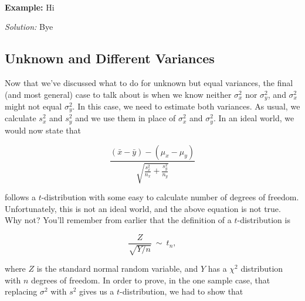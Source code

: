 ~



\textbf{Example:}  Hi \ex



\emph{Solution:} Bye









\subsection{Unknown and Different Variances}



Now that we've discussed what to do for unknown but equal variances, the final (and most general) case to talk about is when we know neither $\sigma^2_x$ nor $\sigma^2_y$, and $\sigma^2_x$ might not equal $\sigma^2_y$.  In this case, we need to estimate both variances.  As usual, we calculate $s^2_x$ and $s^2_y$ and we use them in place of $\sigma^2_x$ and $\sigma^2_y$.  In an ideal world, we would now state that



\begin{equation*}

\frac{\left(\bar{x} - \bar{y}\right) - \left(\mu_x - \mu_y\right)}{\sqrt{\frac{s^2_x}{n_x} + \frac{s^2_y}{n_y}}}

\end{equation*}

follows a $t$-distribution with some easy to calculate number of degrees of freedom.  Unfortunately, this is not an ideal world, and the above equation is not true.  Why not?  You'll remember from earlier that the definition of a $t$-distribution is



\begin{equation*}

\frac{Z}{\sqrt{Y/n}}\ \sim \  t_n,

\end{equation*}

where $Z$ is the standard normal random variable, and $Y$ has a $\chi^2$ distribution with $n$ degrees of freedom.  In order to prove, in the one sample case, that replacing $\sigma^2$ with $s^2$ gives us a $t$-distribution, we had to show that



